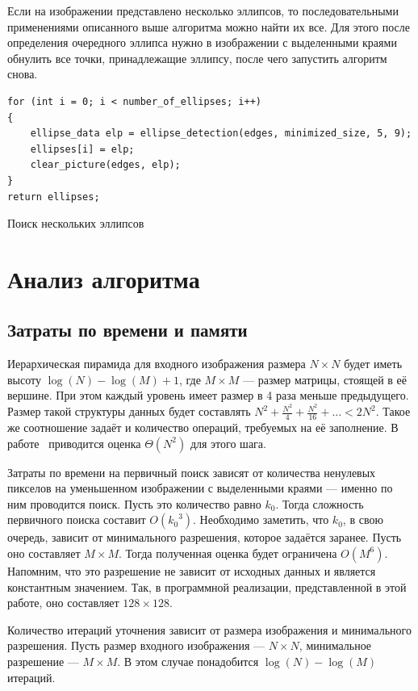 Если на изображении представлено несколько эллипсов, то последовательными применениями описанного выше алгоритма можно найти их все. 
Для этого после определения очередного эллипса нужно в изображении с выделенными краями обнулить все точки, принадлежащие эллипсу, после чего запустить алгоритм снова.

\begin{ListingEnv}[H]
\begin{lstlisting}
for (int i = 0; i < number_of_ellipses; i++)
{
    ellipse_data elp = ellipse_detection(edges, minimized_size, 5, 9);
    ellipses[i] = elp;
    clear_picture(edges, elp);
}
return ellipses;
\end{lstlisting}
\caption{Поиск нескольких эллипсов}
\label{list:several_ellipses}
\end{ListingEnv}

\section{Анализ алгоритма}
\subsection{Затраты по времени и памяти}
Иерархическая пирамида для входного изображения размера $N \times N$ будет иметь высоту \(\log(N) - \log(M) + 1\), где \(M \times M\) --- размер матрицы, стоящей в её вершине. 
При этом каждый уровень имеет размер в 4 раза меньше предыдущего. Размер такой структуры данных будет составлять \(N^2 + \frac{N^2}{4} + \frac{N^2}{16} + ... < 2N^2\).
Такое же соотношение задаёт и количество операций, требуемых на её заполнение. В работе~\autocite{Chien} приводится оценка \(\Theta(N^2)\) для этого шага.

Затраты по времени на первичный поиск зависят от количества ненулевых пикселов на уменьшенном изображении с выделенными краями --- именно по ним проводится поиск.
Пусть это количество равно \(k_0\). Тогда сложность первичного поиска составит \(O({k_0}^3)\). 
Необходимо заметить, что \(k_0\), в свою очередь, зависит от минимального разрешения, которое задаётся заранее. Пусть оно составляет $M \times M$.
Тогда полученная оценка будет ограничена \(O(M^6)\). Напомним, что это разрешение не зависит от исходных данных и является константным значением. 
Так, в программной реализации, представленной в этой работе, оно составляет \(128 \times 128\).

Количество итераций уточнения зависит от размера изображения и минимального разрешения. Пусть размер входного изображения --- \(N \times N\), минимальное разрешение --- \(M \times M\).
В этом случае понадобится \(\log(N) - \log(M)\) итераций.

